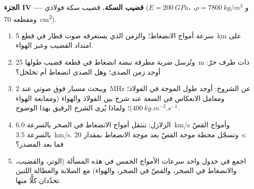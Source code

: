 \begin{problem}
\medskip
\noindent\textbf{الجزء IV --- قضيب السكة.}
قضيب سكة فولاذي ($E = \qty{200}{GPa}$، و $\rho = \qty{7800}{kg/m^3}$، ومقطعه
\qty{70}{cm^2}).
\begin{enumerate}[resume]
  \item سرعة أمواج الانضغاط؛ والزمن الذي يستغرقه صوت قطار في
        قطع \qty{5}{km} على امتداد القضيب وعبر الهواء.
  \item وتُرسل ضربة مطرقة نبضة انضغاط في قطعة قضيب طولها
        \qty{25}{m} ذات طرف حرّ: أوجد زمن الصدى؛ وهل الصدى
        انضغاط أم تخلخل؟
  \item ويبحث مسبار فوق صوتي عند \qty{2}{MHz} عن الشروخ: أوجد طول
        الموجة في الفولاذ؛ ومعامل الانعكاس في السعة عند شرخ
        بين الفولاذ والهواء (وممانعة الهواء $\qty{400}{kg.m^{-2}.s^{-1}}$)؛
        ولماذا يُرى الشرخ الرقيق بهذا الوضوح.
  \item الزلازل: تنتقل أمواج الانضغاط في الصخر بالسرعة
        \qty{6.0}{km/s} وأمواج القصّ بالسرعة \qty{3.5}{km/s}. وتسجّل محطة
        موجة القصّ بعد موجة الانضغاط بمقدار \qty{20}{s}: فما بعد
        المصدر؟
  \item اجمع في جدول واحد سرعات الأمواج الخمس في هذه المسألة
        (الوتر، والقضيب، والانضغاط في الصخر، والقصّ في الصخر،
        والهواء) مع الصلابة والعطالة اللتين تحدّدان كلًّا منها.
\end{enumerate}
\end{problem}
